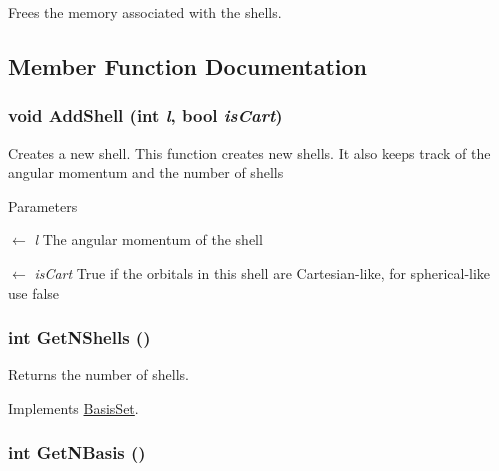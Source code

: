 Frees the memory associated with the shells. 

\subsection{Member Function Documentation}
\hypertarget{classJKBuilder_1_1AtomicBasisSet_aad8da23b7ac00a4855a0eed27e9af7cd}{
\subsubsection[{AddShell}]{\setlength{\rightskip}{0pt plus 5cm}void AddShell (int {\em l}, \/  bool {\em isCart})}}
\label{classJKBuilder_1_1AtomicBasisSet_aad8da23b7ac00a4855a0eed27e9af7cd}


Creates a new shell. This function creates new shells. It also keeps track of the angular momentum and the number of shells 
\begin{DoxyParams}{Parameters}
\item[\mbox{$\leftarrow$} {\em l}]The angular momentum of the shell \item[\mbox{$\leftarrow$} {\em isCart}]True if the orbitals in this shell are Cartesian-\/like, for spherical-\/like use false \end{DoxyParams}
\hypertarget{classJKBuilder_1_1AtomicBasisSet_aa62be7e63d0f2b5828ab72cec3ce8590}{
\subsubsection[{GetNShells}]{\setlength{\rightskip}{0pt plus 5cm}int GetNShells ()}}
\label{classJKBuilder_1_1AtomicBasisSet_aa62be7e63d0f2b5828ab72cec3ce8590}


Returns the number of shells. 

Implements \hyperlink{classJKBuilder_1_1BasisSet_a0eb3b46d258dffcfbc3e4db91f60f4f8}{BasisSet}.\hypertarget{classJKBuilder_1_1AtomicBasisSet_a297c144fb990284ac5973c99cdd55f91}{
\subsubsection[{GetNBasis}]{\setlength{\rightskip}{0pt plus 5cm}int GetNBasis ()}}
\label{classJKBuilder_1_1AtomicBasisSet_a297c144fb990284ac5973c99cdd55f91}


